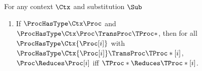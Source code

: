 \begin{lemma}[Bisimulation]
  \label{lemma:translation-bisimulation}
%
  For any context $\Ctx$ and substitution $\Sub$
%
  \begin{enumerate}
    \item If
      $\ProcHasType \Ctx \Proc$
      and
      $\ProcHasType \Ctx \Proc \TransProc \TProc*$,
      then for all
      $\ProcHasType \Ctx {\Proc[i]}$
      with
      $\ProcHasType \Ctx {\Proc[i]} \TransProc \TProc*[i]$,
      $\Proc \Reduces \Proc[i]$
      iff
      $\TProc* \Reduces \TProc*[i]$.
  \end{enumerate}
\end{lemma}

